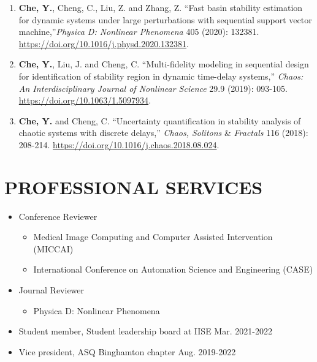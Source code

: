 \documentclass[10pt]{article}
\begin{document}
\begin{enumerate}
	\item {\bf Che, Y.}, Cheng, C., Liu, Z. and Zhang, Z. ``Fast basin stability estimation for dynamic systems under large perturbations with sequential support vector machine,''\textit{Physica D: Nonlinear Phenomena} 405 (2020): 132381. \url{https://doi.org/10.1016/j.physd.2020.132381}.

	\item {\bf Che, Y.}, Liu, J.  and Cheng, C. ``Multi-fidelity modeling in sequential design for identification of stability region in dynamic time-delay systems,''  \textit{Chaos: An Interdisciplinary Journal of Nonlinear Science} 29.9 (2019): 093-105. \url{https://doi.org/10.1063/1.5097934}.

	\item {\bf Che, Y.} and Cheng, C. ``Uncertainty quantification in stability analysis of chaotic systems with discrete delays,'' \textit{Chaos, Solitons} \& \textit{Fractals} 116 (2018): 208-214. \url{https://doi.org/10.1016/j.chaos.2018.08.024}.
\end{enumerate}

\section*{\bf PROFESSIONAL SERVICES}
\begin{itemize}	
		\item Conference Reviewer
		\begin{itemize}[label=$\bullet$]
			\item Medical Image Computing and Computer Assisted Intervention (MICCAI)
			\item International Conference on Automation Science and Engineering (CASE)
		\end{itemize}
        \item Journal Reviewer 
        \begin{itemize}[label=$\bullet$]
            \item Physica D: Nonlinear Phenomena
        \end{itemize}
        
	\item Student member, Student leadership board at IISE
	\hfill{Mar. 2021-2022}
	\item Vice president, ASQ Binghamton chapter
	\hfill{Aug. 2019-2022}
\end{itemize}
\end{document}
